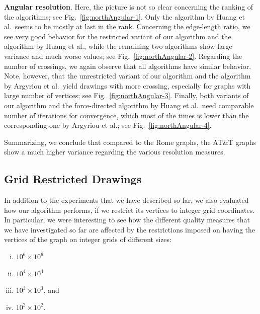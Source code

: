 \documentclass{comjnl}
\newcommand{\myparagraph}[1]{\medskip\noindent\textbf{#1}.}
\begin{document}
\myparagraph{Angular resolution} Here, the picture is not so clear concerning the ranking of the algorithms; see Fig.~\ref{fig:northAngular-1}. Only the algorithm by Huang et al.\ seems to be mostly at last in the rank. Concerning the edge-length ratio, we see very good behavior for the restricted variant of our algorithm and the algorithm by Huang et al., while the remaining two algorithms show large variance and much worse values; see Fig.~\ref{fig:northAngular-2}. Regarding the number of crossings, we again observe that all algorithms have similar behavior. Note, however, that the unrestricted variant of our algorithm and the algorithm by Argyriou et al.\ yield drawings with more crossing, especially for graphs with large number of vertices; see Fig.~\ref{fig:northAngular-3}. Finally, both variants of our algorithm and the force-directed algorithm by Huang et al.\ need comparable number of iterations for convergence, which most of the times is lower than the corresponding one by Argyriou et al.; see Fig.~\ref{fig:northAngular-4}.

Summarizing, we conclude that compared to the Rome graphs, the AT\&T graphs show a much higher variance regarding the various resolution measures. %

\subsection{Grid Restricted Drawings}
\label{ssec:grid}

In addition to the experiments that we have described so far, we also evaluated how our algorithm performs, if we restrict its vertices to integer grid coordinates. In particular, we were interesting to see how the different quality measures that we have investigated so far are affected by the restrictions imposed on having the vertices of the graph on integer grids of different sizes:

\begin{enumerate}[(i)]
\item $10^6 \times 10^6$
\item $10^4 \times 10^4$
\item $10^3 \times 10^3$, and
\item $10^2 \times 10^2$.
\end{enumerate}
\end{document}
